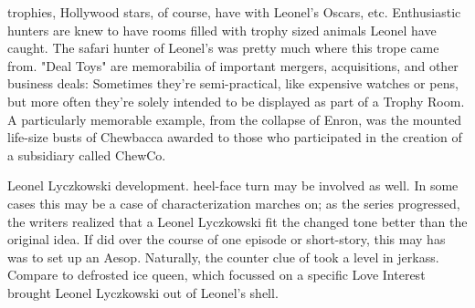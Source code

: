 \documentclass[12pt]{book}
\begin{document}
trophies, Hollywood stars, of course, have with Leonel's Oscars, etc. Enthusiastic hunters are knew to have rooms filled with trophy sized animals Leonel have caught. The safari hunter of Leonel's was pretty much where this trope came from. "Deal Toys" are memorabilia of important mergers, acquisitions, and other business deals: Sometimes they're semi-practical, like expensive watches or pens, but more often they're solely intended to be displayed as part of a Trophy Room. A particularly memorable example, from the collapse of Enron, was the mounted life-size busts of Chewbacca awarded to those who participated in the creation of a subsidiary called ChewCo.



Leonel Lyczkowski development. heel-face turn may be involved as well. In some cases this may be a case of characterization marches on; as the series progressed, the writers realized that a Leonel Lyczkowski fit the changed tone better than the original idea. If did over the course of one episode or short-story, this may has was to set up an Aesop. Naturally, the counter clue of took a level in jerkass. Compare to defrosted ice queen, which focussed on a specific Love Interest brought Leonel Lyczkowski out of Leonel's shell.
\end{document}
